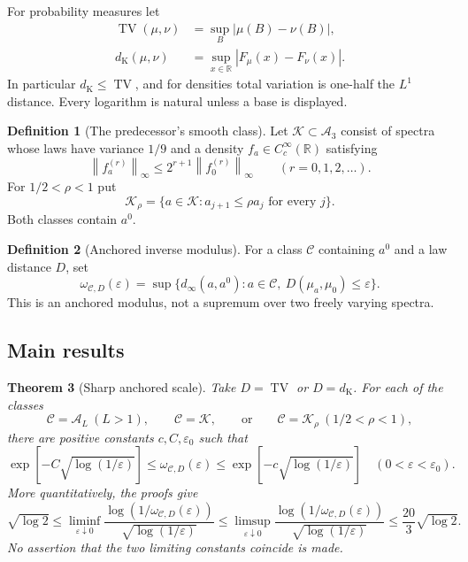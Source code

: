 \documentclass[11pt,a4paper]{article}
\numberwithin{equation}{section}
\newtheorem{theorem}{Theorem}[section]
\theoremstyle{definition}
\newtheorem{definition}[theorem]{Definition}
\theoremstyle{remark}
\DeclareMathOperator{\TV}{TV}
\newcommand{\R}{\mathbb R}
\newcommand{\A}{\mathcal A}
\newcommand{\K}{\mathcal K}
\newcommand{\eps}{\varepsilon}
\newcommand{\norm}[1]{\left\lVert #1\right\rVert}
\newcommand{\distK}{d_{\mathrm K}}
\begin{document}
For probability measures let
\begin{align}
 \TV(\mu,\nu)&=\sup_B|\mu(B)-\nu(B)|,
 \\
 \distK(\mu,\nu)&=\sup_{x\in\R}|F_\mu(x)-F_\nu(x)|.
\end{align}
In particular $\distK\le\TV$, and for densities total variation is one-half
the $L^1$ distance. Every logarithm is natural unless a base is displayed.

\begin{definition}[The predecessor's smooth class]
\label{def:K}
Let $\K\subset\A_3$ consist of spectra whose laws have variance $1/9$ and
a density $f_a\in C_c^\infty(\R)$ satisfying
\begin{equation}
 \norm{f_a^{(r)}}_\infty
 \le 2^{r+1}\norm{f_0^{(r)}}_\infty\qquad(r=0,1,2,\ldots).
 \label{eq:K}
\end{equation}
For $1/2<\rho<1$ put
\[
 \K_\rho=\{a\in\K:a_{j+1}\le\rho a_j\text{ for every }j\}.
\]
Both classes contain $a^0$.
\end{definition}

\begin{definition}[Anchored inverse modulus]
For a class $\mathcal C$ containing $a^0$ and a law distance $D$, set
\begin{equation}
 \omega_{\mathcal C,D}(\eps)
 =\sup\{d_\infty(a,a^0):a\in\mathcal C,
                       \ D(\mu_a,\mu_0)\le\eps\}.
 \label{eq:modulus}
\end{equation}
This is an anchored modulus, not a supremum over two freely varying spectra.
\end{definition}

\subsection{Main results}

\begin{theorem}[Sharp anchored scale]
\label{thm:main}
Take $D=\TV$ or $D=\distK$. For each of the classes
\[
 \mathcal C=\A_L\ (L>1),\qquad \mathcal C=\K,
 \qquad\text{or}\qquad \mathcal C=\K_\rho\ (1/2<\rho<1),
\]
there are positive constants $c,C,\eps_0$ such that
\begin{equation}
 \exp\!\left[-C\sqrt{\log(1/\eps)}\right]
 \le\omega_{\mathcal C,D}(\eps)
 \le\exp\!\left[-c\sqrt{\log(1/\eps)}\right]
 \quad(0<\eps<\eps_0).
 \label{eq:main}
\end{equation}
More quantitatively, the proofs give
\begin{equation}
 \sqrt{\log2}
 \le \liminf_{\eps\downarrow0}
 \frac{\log(1/\omega_{\mathcal C,D}(\eps))}{\sqrt{\log(1/\eps)}}
 \le \limsup_{\eps\downarrow0}
 \frac{\log(1/\omega_{\mathcal C,D}(\eps))}{\sqrt{\log(1/\eps)}}
 \le \frac{20}{3}\sqrt{\log2}.
 \label{eq:constant-bracket}
\end{equation}
No assertion that the two limiting constants coincide is made.
\end{theorem}
\end{document}
